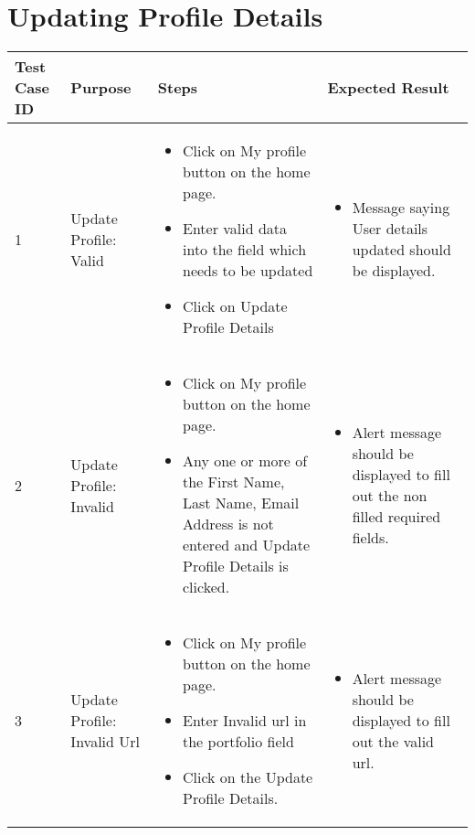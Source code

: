 \documentclass[english,a4paper,12pt]{report}
\begin{document}
\section{Updating Profile Details}
\begin{longtable} { | p{2cm} | p{3cm}| p{6cm}| p{6cm} |} 
\hline 
\textbf{Test Case ID} & \textbf{Purpose}  & \textbf{Steps} &\textbf{Expected Result} \\
\hline 1 &  Update Profile: Valid &  
\vspace{-5mm}
\begin{itemize}
\item Click on My profile button on the home page.
\item Enter valid data into the field which needs to be updated 
\item Click on Update Profile Details 
\end{itemize}
& 
\vspace{-5mm}
\begin{itemize}
\item Message saying User details updated should be displayed.
\end{itemize}\\ 
\hline 2 & Update Profile: Invalid & 
\vspace{-5mm}
\begin{itemize}
\item Click on My profile button on the home page.
\item Any one or more of the First Name, Last Name, Email Address is not entered and Update Profile Details is clicked.
\end{itemize}& 
\vspace{-5mm}
\begin{itemize}
\item Alert message should be displayed to fill out the non filled required fields.
\end{itemize}\\
\hline 3 &  Update Profile: Invalid Url &  
\vspace{-5mm}
\begin{itemize}
\item Click on My profile button on the home page.
\item Enter Invalid url in the portfolio field
\item Click on the Update Profile Details.
\end{itemize}&
\vspace{-5mm}
\begin{itemize}
\item Alert message should be displayed to fill out the valid url.
\end{itemize}\\
\hline
\end{longtable}
\end{document}
